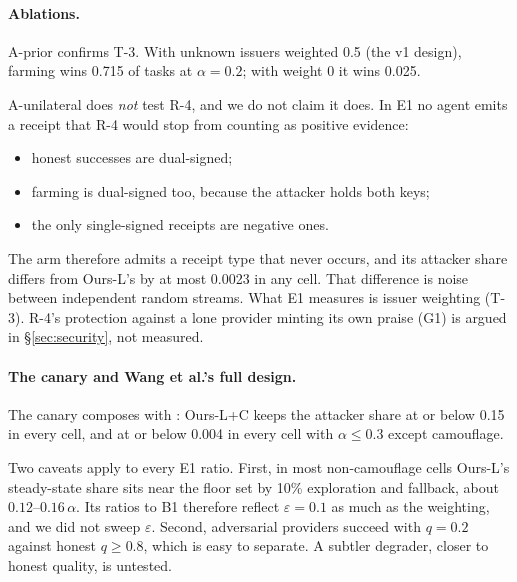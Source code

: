 \paragraph{Ablations.}
A-prior confirms T-3. With unknown issuers weighted 0.5 (the v1 design),
farming wins 0.715 of tasks at $\alpha{=}0.2$; with weight 0 it wins
0.025.

A-unilateral does \emph{not} test R-4, and we do not claim it does. In
E1 no agent emits a receipt that R-4 would stop from counting as
positive evidence:
\begin{itemize}
\item honest successes are dual-signed;
\item farming is dual-signed too, because the attacker holds both keys;
\item the only single-signed receipts are negative ones.
\end{itemize}
The arm therefore admits a receipt type that never occurs, and its
attacker share differs from Ours-L's by at most 0.0023 in any cell. That
difference is noise between independent random streams. What E1 measures
is issuer weighting (T-3). R-4's protection against a lone provider
minting its own praise (G1) is argued in \S\ref{sec:security}, not
measured.

\paragraph{The canary and Wang et al.'s full design.}
The canary composes with \sys{}: Ours-L+C keeps the attacker share at or
below 0.15 in every cell, and at or below 0.004 in every cell with
$\alpha\le0.3$ except camouflage.

Two caveats apply to every E1 ratio. First, in most non-camouflage cells
Ours-L's steady-state share sits near the floor set by 10\% exploration
and fallback, about $0.12$--$0.16\,\alpha$. Its ratios to B1 therefore
reflect $\varepsilon{=}0.1$ as much as the weighting, and we did not
sweep $\varepsilon$. Second, adversarial providers succeed with $q{=}0.2$
against honest $q\ge0.8$, which is easy to separate. A subtler degrader,
closer to honest quality, is untested.

